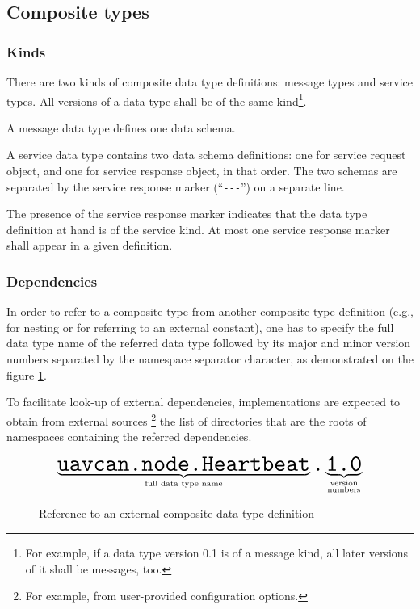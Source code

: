 \subsection{Composite types}\label{sec:dsdl_composite_types}

\subsubsection{Kinds}

There are two kinds of composite data type definitions: message types and service types.
All versions of a data type shall be of the same kind\footnote{%
For example, if a data type version 0.1 is of a message kind, all later versions of it shall be messages, too.}.

A message data type defines one data schema.

A service data type contains two data schema definitions:
one for service request object, and one for service response object, in that order.
The two schemas are separated by the service response marker (``\verb|---|'') on a separate line.

The presence of the service response marker indicates that the data type definition at hand is of the service kind.
At most one service response marker shall appear in a given definition.

\subsubsection{Dependencies}

In order to refer to a composite type from another composite type definition
(e.g., for nesting or for referring to an external constant),
one has to specify the full data type name of the referred data type followed by its
major and minor version numbers separated by the namespace separator character,
as demonstrated on the figure \ref{fig:dsdl_nested_reference}.

To facilitate look-up of external dependencies,
implementations are expected to obtain from external sources%
\footnote{For example, from user-provided configuration options.}
the list of directories that are the roots of namespaces containing the referred dependencies.

\begin{figure}[H]
    $$
    \underbrace{\texttt{\huge{uavcan.node.Heartbeat}}}_{\text{full data type name}}%
    \texttt{\huge{.}}%
    \underbrace{\texttt{\huge{1.0}}}_{\substack{\text{version} \\ \text{numbers}}}%
    $$
    \caption{Reference to an external composite data type definition\label{fig:dsdl_nested_reference}}
\end{figure}

